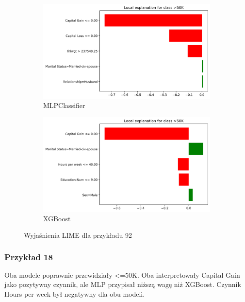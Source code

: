 \documentclass[12pt,a4paper]{article}
\begin{document}
\begin{figure}[H]
  \centering
  \begin{subfigure}{0.45\textwidth}
    \centering
    \includegraphics[width=\textwidth]{../out/mlp-92.png}
    \caption{MLPClassifier}
  \end{subfigure}
  \begin{subfigure}{0.45\textwidth}
    \centering
    \includegraphics[width=\textwidth]{../out/xgboost-92.png}
    \caption{XGBoost}
  \end{subfigure}
  \caption{Wyjaśnienia LIME dla przykładu 92}
\end{figure}

\subsubsection{Przykład 18}

Oba modele poprawnie przewidziały <=50K. Oba interpretowały Capital Gain jako pozytywny czynnik, ale MLP przypisał niższą wagę niż XGBoost. Czynnik Hours per week był negatywny dla obu modeli.
\end{document}
